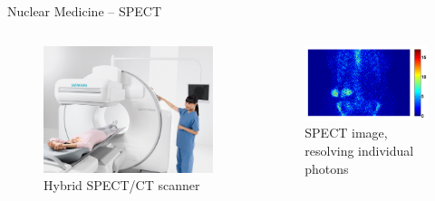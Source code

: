 

\begin{frame}[c]{Nuclear Medicine -- SPECT}

	\begin{columns}[c, onlytextwidth]
		\begin{column}{0.5\textwidth}
			\centering{}
			\begin{figure}[k]
				\centering

				\includegraphics[height=0.7\linewidth]{images/SH_MI_37127_13.jpg}
				\caption{Hybrid SPECT/CT scanner}
			\end{figure}
		\end{column}\begin{column}{0.5\textwidth}
			\begin{figure}
				\centering{}
				\includegraphics[width=1.0\linewidth]{images/boneproj.png}
				\caption{SPECT image, resolving individual photons}
			\end{figure}
		\end{column}
	\end{columns}

\end{frame}

